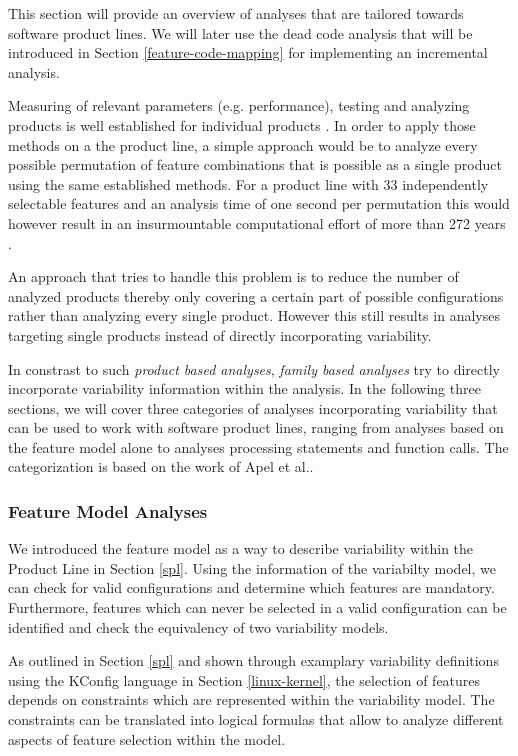 \documentclass[a4paper]{article}
\begin{document}
This section will provide an overview of analyses that are tailored towards software product lines. We will later use the dead code analysis that will be introduced in Section \ref{feature-code-mapping}  for implementing an incremental analysis.

Measuring of relevant parameters (e.g. performance), testing and analyzing products is well established for individual products \cite[p.243]{Apel:2013:FSP:2541773}. 
In order to apply those methods on a the product line, a simple approach would be to analyze every possible permutation of feature combinations that is possible as a single product using the same established methods. For a product line with 33 independently selectable features and an analysis time of one second per permutation this would however result in an insurmountable computational effort of more than 272 years \cite{Thum:2014:CSA:2620784.2580950}. 

An approach that tries to handle this problem is to reduce the number of analyzed products thereby only covering a certain part of possible configurations rather than analyzing every single product. However this still results in analyses targeting single products instead of directly incorporating variability. 

In constrast to such \emph{product based analyses}, \emph{family based analyses} try to directly incorporate variability information within the analysis. In the following three sections, we will cover three categories of analyses incorporating variability that can be used to work with software product lines, ranging from analyses based on the feature model alone  to analyses processing statements and function calls. The categorization is based on the work of Apel et al.\cite{Apel:2013:FSP:2541773}.

\subsubsection{Feature Model Analyses}

We introduced the feature model as a way to describe variability within the Product Line in Section \ref{spl}. Using the information of the variabilty model, we can check for valid configurations and determine which features are mandatory.
Furthermore, features which can never be selected in a valid configuration can be identified and check the equivalency of two variability models.

As outlined in Section \ref{spl} and shown through examplary variability definitions using the KConfig language in Section \ref{linux-kernel}, the selection of features depends on constraints which are represented within the variability model. The constraints can be translated into logical formulas that allow to analyze different aspects of feature selection within the model.
\end{document}
